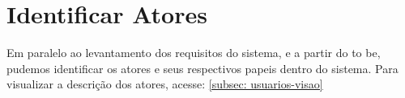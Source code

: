 \chapter{Identificar Atores}

Em paralelo ao levantamento dos requisitos do sistema, e a partir do to be, pudemos identificar os atores e seus respectivos papeis dentro do sistema. Para visualizar a descrição dos atores, acesse: \ref{subsec: usuarios-visao}
